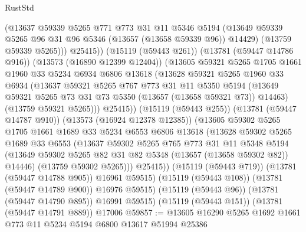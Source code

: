 \begin{lexlean}{RustStd}
\begin{coremodule}
                    (@13637
                      @59339
                      @5265
                      @771
                      @773
                      @31
                      @11
                      @5346
                      @5194
                      (@13649 @59339 @5265 @96 @31 @96 @5346 (@13657 (@13658 @59339 @96)) @14429)
                      (@13759 @59339 @5265)))
                  @25415))
              (@15119 (@59443 @261))
              (@13781 (@59447 @14786 @916))
              (@13573 (@16890 @12399 @12404))
              (@13605
                @59321
                @5265
                @1705
                @1661
                @1960
                @33
                @5234
                @6934
                @6806
                @13618
                (@13628
                  @59321
                  @5265
                  @1960
                  @33
                  @6934
                  (@13637
                    @59321
                    @5265
                    @767
                    @773
                    @31
                    @11
                    @5350
                    @5194
                    (@13649 @59321 @5265 @73 @31 @73 @5350 (@13657 (@13658 @59321 @73)) @14463)
                    (@13759 @59321 @5265)))
                @25415))
            (@15119 (@59443 @255))
            (@13781 (@59447 @14787 @910))
            (@13573 (@16924 @12378 @12385))
            (@13605
              @59302
              @5265
              @1705
              @1661
              @1689
              @33
              @5234
              @6553
              @6806
              @13618
              (@13628
                @59302
                @5265
                @1689
                @33
                @6553
                (@13637
                  @59302
                  @5265
                  @765
                  @773
                  @31
                  @11
                  @5348
                  @5194
                  (@13649 @59302 @5265 @82 @31 @82 @5348 (@13657 (@13658 @59302 @82)) @14446)
                  (@13759 @59302 @5265)))
              @25415))
          (@15119 (@59443 @719))
          (@13781 (@59447 @14788 @905))
          @16961
          @59515)
        (@15119 (@59443 @108))
        (@13781 (@59447 @14789 @900))
        @16976
        @59515)
      (@15119 (@59443 @96))
      (@13781 (@59447 @14790 @895))
      @16991
      @59515)
    (@15119 (@59443 @151))
    (@13781 (@59447 @14791 @889))
    @17006
@59857 := @13605 @16290 @5265 @1692 @1661 @773 @11 @5234 @5194 @6800 @13617 @51994 @25386

\end{coremodule}
\end{lexlean}
